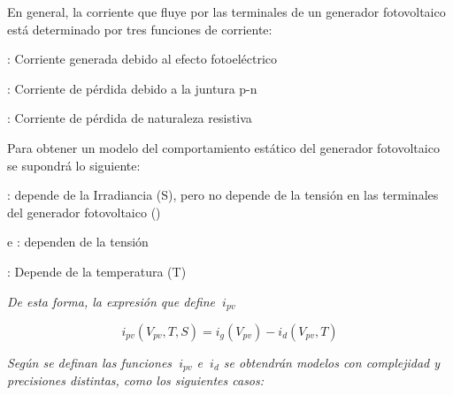   
En general, la corriente que fluye por las terminales de un generador fotovoltaico está determinado por tres funciones de corriente:
\begin{compactitem}
\item {}: Corriente generada debido al efecto fotoeléctrico
\item {}: Corriente de pérdida debido a la juntura p-n
\item {}: Corriente de pérdida de naturaleza resistiva
\end{compactitem}


 Para obtener un modelo del comportamiento estático del generador fotovoltaico se supondrá lo siguiente:

\begin{compactitem} 
\item {}: depende de la Irradiancia (S), pero no depende de la tensión en las terminales del generador fotovoltaico ()
\item {} e : dependen de la tensión 
\item {}: Depende de la temperatura (T)
\end{compactitem}

\textsl{De esta forma, la expresión que define $\ i_{pv}$}

\begin{equation} \label{eq:ej4}
  i_{pv} \left(V_{pv},T,S \right) 
  =
  i_g \left(V_{pv}\right)-i_d \left(V_{pv},T\right)
\end{equation}

\textsl{Según se definan las funciones $\ i_{pv}$ e $\ i_{d}$ se obtendrán modelos con complejidad y precisiones distintas, como los siguientes casos:  }


